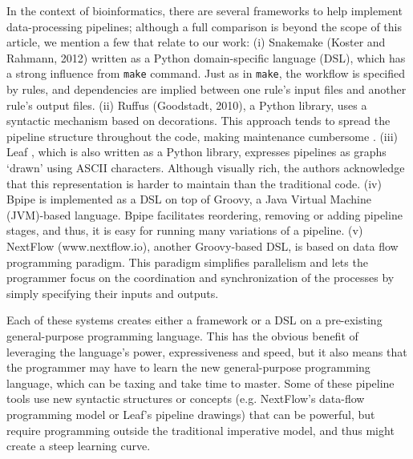 In the context of bioinformatics, there are several frameworks to help implement data-processing pipelines; although a full comparison is beyond the scope of this article, we mention a few that relate to our work: (i) Snakemake (Koster and Rahmann, 2012) written as a Python domain-specific language (DSL), which has a strong influence from \texttt{make} command. Just as in \texttt{make}, the workflow is specified by rules, and dependencies are implied between one rule’s input files and another rule’s output files. (ii) Ruffus (Goodstadt, 2010), a Python library, uses a syntactic mechanism based on decorations. This approach tends to spread the pipeline structure throughout the code, making maintenance cumbersome \cite{sadedin2012bpipe}. (iii) Leaf \cite{napolitano2013bioinformatic}, which is also written as a Python library, expresses pipelines as graphs ‘drawn’ using ASCII characters. Although visually rich, the authors acknowledge that this representation is harder to maintain than the traditional code. (iv) Bpipe \cite{sadedin2012bpipe} is implemented as a DSL on top of Groovy, a Java Virtual Machine (JVM)-based language. Bpipe facilitates reordering, removing or adding pipeline stages, and thus, it is easy for running many variations of a pipeline. (v) NextFlow (www.nextflow.io), another Groovy-based DSL, is based on data flow programming paradigm. This paradigm simplifies parallelism and lets the programmer focus on the coordination and synchronization of the processes by simply specifying their inputs and outputs.

Each of these systems creates either a framework or a DSL on a pre-existing general-purpose programming language. This has the obvious benefit of leveraging the language’s power, expressiveness and speed, but it also means that the programmer may have to learn the new general-purpose programming language, which can be taxing and take time to master. Some of these pipeline tools use new syntactic structures or concepts (e.g. NextFlow’s data-flow programming model or Leaf’s pipeline drawings) that can be powerful, but require programming outside the traditional imperative model, and thus might create a steep learning curve.

